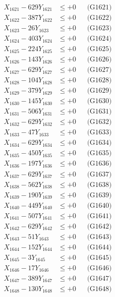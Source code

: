 \documentclass[a4paper,10pt]{article}
\begin{document}
{\begin{align}
\allowbreak
X_{1621} - 629Y_{1621} &\leq +0 && \text{(G1621)} \\
X_{1622} - 387Y_{1622} &\leq +0 && \text{(G1622)} \\
X_{1623} - 26Y_{1623} &\leq +0 && \text{(G1623)} \\
X_{1624} - 403Y_{1624} &\leq +0 && \text{(G1624)} \\
X_{1625} - 224Y_{1625} &\leq +0 && \text{(G1625)} \\
X_{1626} - 143Y_{1626} &\leq +0 && \text{(G1626)} \\
X_{1627} - 629Y_{1627} &\leq +0 && \text{(G1627)} \\
X_{1628} - 104Y_{1628} &\leq +0 && \text{(G1628)} \\
X_{1629} - 379Y_{1629} &\leq +0 && \text{(G1629)} \\
X_{1630} - 145Y_{1630} &\leq +0 && \text{(G1630)} \\
\allowbreak
X_{1631} - 506Y_{1631} &\leq +0 && \text{(G1631)} \\
X_{1632} - 629Y_{1632} &\leq +0 && \text{(G1632)} \\
X_{1633} - 47Y_{1633} &\leq +0 && \text{(G1633)} \\
X_{1634} - 629Y_{1634} &\leq +0 && \text{(G1634)} \\
X_{1635} - 450Y_{1635} &\leq +0 && \text{(G1635)} \\
X_{1636} - 197Y_{1636} &\leq +0 && \text{(G1636)} \\
X_{1637} - 629Y_{1637} &\leq +0 && \text{(G1637)} \\
X_{1638} - 562Y_{1638} &\leq +0 && \text{(G1638)} \\
X_{1639} - 190Y_{1639} &\leq +0 && \text{(G1639)} \\
X_{1640} - 449Y_{1640} &\leq +0 && \text{(G1640)} \\
\allowbreak
X_{1641} - 507Y_{1641} &\leq +0 && \text{(G1641)} \\
X_{1642} - 629Y_{1642} &\leq +0 && \text{(G1642)} \\
X_{1643} - 51Y_{1643} &\leq +0 && \text{(G1643)} \\
X_{1644} - 152Y_{1644} &\leq +0 && \text{(G1644)} \\
X_{1645} - 3Y_{1645} &\leq +0 && \text{(G1645)} \\
X_{1646} - 17Y_{1646} &\leq +0 && \text{(G1646)} \\
X_{1647} - 389Y_{1647} &\leq +0 && \text{(G1647)} \\
X_{1648} - 130Y_{1648} &\leq +0 && \text{(G1648)} \\

\end{align}}
\end{document}
